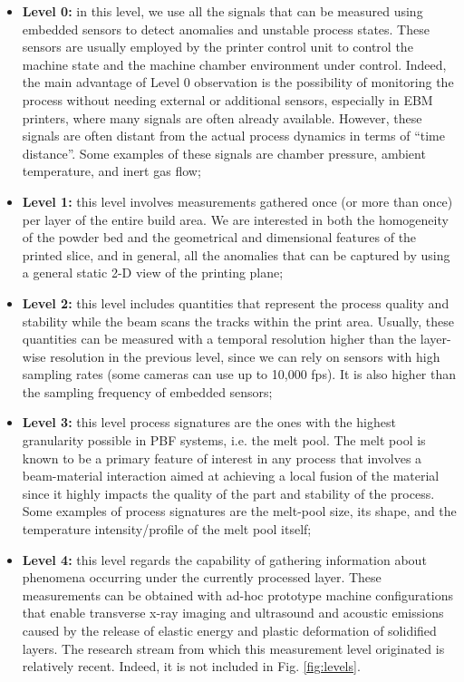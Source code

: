 \begin{itemize}
    \item \textbf{Level 0:} in this level, we use all the signals that can be measured using embedded sensors to detect anomalies and unstable process states. These sensors are usually employed by the printer control unit to control the machine state and the machine chamber environment under control. Indeed, the main advantage of Level 0 observation is the possibility of monitoring the process without needing external or additional sensors, especially in EBM printers, where many signals are often already available. However, these signals are often distant from the actual process dynamics in terms of “time distance”. Some examples of these signals are chamber pressure, ambient temperature, and inert gas flow;
    \item \textbf{Level 1:} this level involves measurements gathered once (or more than once) per layer of the entire build area. We are interested in both the homogeneity of the powder bed and the geometrical and dimensional features of the printed slice, and in general, all the anomalies that can be captured by using a general static 2-D view of the printing plane;
    \item \textbf{Level 2:} this level includes quantities that represent the process quality and stability while the beam scans the tracks within the print area. Usually, these quantities can be measured with a temporal resolution higher than the layer-wise resolution in the previous level, since we can rely on sensors with high sampling rates (some cameras can use up to 10,000 fps). It is also higher than the sampling frequency of embedded sensors;
    \item \textbf{Level 3:} this level process signatures are the ones with the highest granularity possible in PBF systems, i.e. the melt pool. The melt pool is known to be a primary feature of interest in any process that involves a beam-material interaction aimed at achieving a local fusion of the material since it highly impacts the quality of the part and stability of the process. Some examples of process signatures are the melt-pool size, its shape, and the temperature intensity/profile of the melt pool itself;
    \item \textbf{Level 4:} this level regards the capability of gathering information about phenomena occurring under the currently processed layer. These measurements can be obtained with ad-hoc prototype machine configurations that enable transverse x-ray imaging and ultrasound and acoustic emissions caused by the release of elastic energy and plastic deformation of solidified layers. The research stream from which this measurement level originated is relatively recent. Indeed, it is not included in Fig. \ref{fig:levels}.
\end{itemize}

